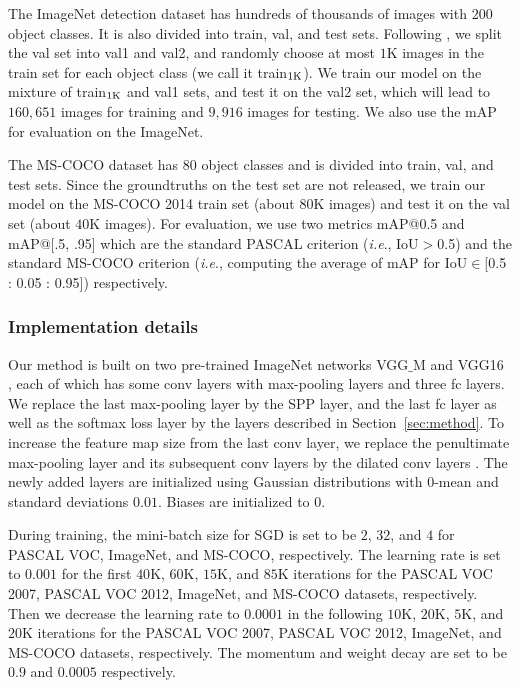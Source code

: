 \documentclass[10pt,journal,compsoc]{IEEEtran}
\def\ie{\emph{i.e}.} \def\Ie{\emph{I.e}.}
\begin{document}
The ImageNet detection dataset has hundreds of thousands of images with $200$ object classes.
It is also divided into train, val, and test sets.
Following \cite{Ref:Girshick2016}, we split the val set into val1 and val2, and randomly choose at most $1$K images in the train set for each object class (we call it train$_{\textup{1K}}$).
We train our model on the mixture of train$_{\textup{1K}}$ and val1 sets, and test it on the val2 set,
which will lead to $160,651$ images for training and $9,916$ images for testing.
We also use the mAP for evaluation on the ImageNet.

{
The MS-COCO dataset has $80$ object classes
and is divided into train, val, and test sets.
Since the groundtruths on the test set are not released,
we train our model on the MS-COCO 2014 train set (about $80$K images) and test it on the val set (about $40$K images).
For evaluation, we use two metrics mAP@0.5 and mAP@[.5, .95]
which are the standard PASCAL criterion (\ie, IoU$>$0.5)
and the standard MS-COCO criterion
(\ie, computing the average of mAP for IoU$\in$[0.5 : 0.05 : 0.95]) respectively.
}




\subsubsection{Implementation details}
Our method is built on two pre-trained ImageNet \cite{Ref:Russakovsky2015} networks VGG$\_$M \cite{Ref:Chatfield2014} and VGG16 \cite{Ref:Simonyan2015},
each of which has some conv layers with max-pooling layers and three fc layers.
We replace the last max-pooling layer by the SPP layer,
and the last fc layer as well as the softmax loss layer by the layers described in Section~\ref{sec:method}.
To increase the feature map size from the last conv layer,
we replace the penultimate max-pooling layer and its subsequent conv layers by the dilated conv layers \cite{Ref:Yu2016,Ref:Chen2017}.
The newly added layers are initialized using Gaussian distributions with $0$-mean and standard deviations $0.01$.
Biases are initialized to $0$.

During training, the mini-batch size for SGD is set to be $2$, $32$, {and $4$} for PASCAL VOC, ImageNet, {and MS-COCO}, respectively.
The learning rate is set to $0.001$ for the first $40$K, $60$K, $15$K, {and $85$K} iterations for the PASCAL VOC 2007, PASCAL VOC 2012, ImageNet, {and MS-COCO} datasets, respectively.
Then we decrease the learning rate to $0.0001$ in the following $10$K, $20$K, $5$K, {and $20$K} iterations for the PASCAL VOC 2007, PASCAL VOC 2012, ImageNet, {and MS-COCO} datasets, respectively.
The momentum and weight decay are set to be $0.9$ and $0.0005$ respectively.
\end{document}

